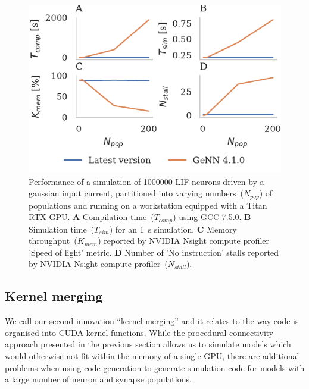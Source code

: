\documentclass[9pt,twocolumn,twoside,lineno]{pnas-new}
\begin{document}
\begin{figure}
    \centering
    \includegraphics{figures/merging_scaling}
    \caption{Performance of a simulation of \num{1000000} LIF neurons driven by a gaussian input current, partitioned into varying numbers~($N_{pop}$) of populations and running on a workstation equipped with a Titan RTX GPU.
    \textbf{A} Compilation time~($T_{comp}$) using GCC 7.5.0.
    \textbf{B} Simulation time~($T_{sim}$) for an \SI{1}{\second} simulation.
    \textbf{C} Memory throughput~($K_{mem}$) reported by NVIDIA Nsight compute profiler 'Speed of light' metric.
    \textbf{D} Number of 'No instruction' stalls reported by NVIDIA Nsight compute profiler~($N_{stall}$).}
    \label{fig:merging_scaling}
\end{figure}

\subsection*{Kernel merging}
We call our second innovation ``kernel merging'' and it relates to the way code is organised into CUDA kernel functions.
While the procedural connectivity approach presented in the previous section allows us to simulate models which would otherwise not fit within the memory of a single GPU, there are additional problems when using code generation to generate simulation code for models with a large number of neuron and synapse populations.
\end{document}
